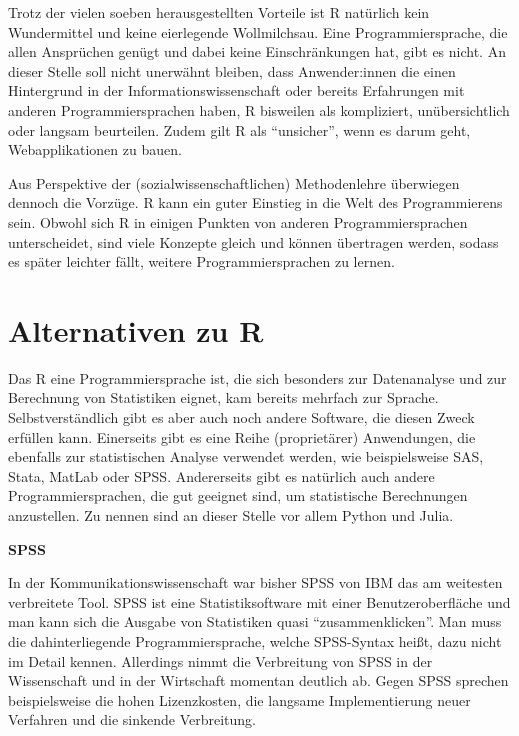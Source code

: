 \documentclass[
]{book}
\begin{document}
Trotz der vielen soeben herausgestellten Vorteile ist R natürlich kein Wundermittel und keine eierlegende Wollmilchsau. Eine Programmiersprache, die allen Ansprüchen genügt und dabei keine Einschränkungen hat, gibt es nicht. An dieser Stelle soll nicht unerwähnt bleiben, dass Anwender:innen die einen Hintergrund in der Informationswissenschaft oder bereits Erfahrungen mit anderen Programmiersprachen haben, R bisweilen als kompliziert, unübersichtlich oder langsam beurteilen. Zudem gilt R als ``unsicher'', wenn es darum geht, Webapplikationen zu bauen.

Aus Perspektive der (sozialwissenschaftlichen) Methodenlehre überwiegen dennoch die Vorzüge.
R kann ein guter Einstieg in die Welt des Programmierens sein. Obwohl sich R in einigen Punkten von anderen Programmiersprachen unterscheidet, sind viele Konzepte gleich und können übertragen werden, sodass es später leichter fällt, weitere Programmiersprachen zu lernen.

\hypertarget{alternativen-zu-r}{%
\section{Alternativen zu R}\label{alternativen-zu-r}}

Das R eine Programmiersprache ist, die sich besonders zur Datenanalyse und zur Berechnung von
Statistiken eignet, kam bereits mehrfach zur Sprache. Selbstverständlich gibt es aber auch noch
andere Software, die diesen Zweck erfüllen kann.
Einerseits gibt es eine Reihe (proprietärer) Anwendungen, die ebenfalls zur statistischen Analyse verwendet werden, wie beispielsweise SAS, Stata, MatLab oder SPSS.
Andererseits gibt es natürlich auch andere Programmiersprachen, die gut geeignet sind, um statistische
Berechnungen anzustellen.
Zu nennen sind an dieser Stelle vor allem Python und Julia.

\leavevmode\hypertarget{info_spss}{}%
\textbf{SPSS}

In der Kommunikationswissenschaft war bisher SPSS von IBM das am weitesten verbreitete Tool.
SPSS ist eine Statistiksoftware mit einer Benutzeroberfläche und man kann sich die Ausgabe von Statistiken quasi ``zusammenklicken''.
Man muss die dahinterliegende Programmiersprache, welche SPSS-Syntax heißt, dazu nicht im Detail kennen.
Allerdings nimmt die Verbreitung von SPSS in der Wissenschaft und in der Wirtschaft momentan
deutlich ab.
Gegen SPSS sprechen beispielsweise die hohen Lizenzkosten, die langsame Implementierung neuer Verfahren und die sinkende Verbreitung.
\end{document}
